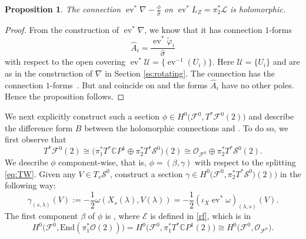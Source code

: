\documentclass[pdftex]{sigma}
\numberwithin{equation}{section}
\newtheorem{Proposition}[Theorem]{Proposition}
\theoremstyle{definition}
\newcommand\C{{\mathbb C}}
\begin{document}
\begin{Proposition}\label{p:holconn}
The connection $\operatorname{ev}^*\nabla - \frac{\phi}{\widehat\sigma}$ on
$\operatorname{ev}^*L_Z = \pi_2^*\mathcal{L}$ is holomorphic.
\end{Proposition}

\begin{proof}
From the construction of $\operatorname{ev}^*\nabla$, we know that it has connection $1$-forms
\[
\widehat{A}_i = \frac{\operatorname{ev}^*\widetilde{\varphi}_i}{\widehat\sigma}
\]
with respect to the open covering $\operatorname{ev}^*\mathcal U = \bigl\{\operatorname{ev}^{-1}(U_i)\bigr\}$.
Here $\mathcal U = \{U_i\}$ and  are as in the construction of
$\nabla$ in Section \ref{ss:rotating}.
The connection  has the connection $1$-forms~.
But  and  coincide on  and the forms $\widehat{A}_i$ have no other poles.
Hence the proposition follows.
\end{proof}

We next explicitly construct such a section $\phi \in H^0\bigl(\mathcal F^0,
T^*\mathcal F^0(2)\bigr)$ and describe the difference form $B$ between the holomorphic
connections  and .
To do so, we first observe that
\begin{equation}\label{eq:TW}
T^*\mathcal F^0(2) \cong \bigl(\pi_1^*T^*\C P^1 \oplus \pi_2^*T^*\mathcal{S}^0\bigr)(2)
 \cong \mathcal{O}_{\mathcal F^0} \oplus \pi_2^*T^*\mathcal{S}^0(2).
\end{equation}
We describe $\phi$ component-wise, that is, $\phi = (\beta, \gamma)$ with respect to the
splitting \eqref{eq:TW}.
Given any $V \in T_{s} \mathcal{S}^0$,
construct a section $\gamma \in H^0\bigl(\mathcal F^0, \pi_2^*T^*\mathcal{S}^0\bigr)(2))$ in the following
way:
\[
\gamma_{(s,\lambda)} (V) := -\frac{1}{2}\omega(X_s(\lambda), V(\lambda))
 = -\frac{1}{2}(\iota_X\operatorname{ev}^*\omega)_{(\lambda,s)}(V).
\]
The first component $\beta$ of $\phi$ is
,
where $\mathcal E$ is defined in \eqref{rf}, which is in
\[H^0\bigl(\mathcal F^0, \mathrm{End}(\pi_1^*\mathcal{O}(2))\bigr)
 = H^0\bigl(\mathcal F^0, \pi_1^*T^*\C P^1(2)\bigr)
 \cong H^0\bigl(\mathcal F^0, \mathcal O_{\mathcal F^0}\bigr).\]
\end{document}
